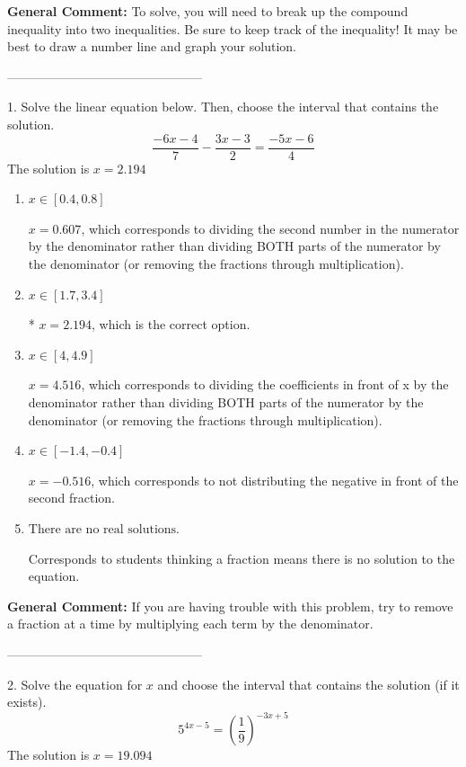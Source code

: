 \documentclass{extbook}[14pt]
\begin{document}
\textbf{General Comment:} To solve, you will need to break up the compound inequality into two inequalities. Be sure to keep track of the inequality! It may be best to draw a number line and graph your solution. 

-----------------------------------------------

1. Solve the linear equation below. Then, choose the interval that contains the solution.
\[ \frac{-6x -4}{7} - \frac{3x -3}{2} = \frac{-5x -6}{4} \] 
The solution is $ x = 2.194 $ 

\begin{enumerate}[label=\Alph*.] 
\item $ x \in [0.4, 0.8] $ 

  $x = 0.607$, which corresponds to dividing the second number in the numerator by the denominator rather than dividing BOTH parts of the numerator by the denominator (or removing the fractions through multiplication). 
\item $ x \in [1.7, 3.4] $ 

 * $x = 2.194$, which is the correct option. 
\item $ x \in [4, 4.9] $ 

  $x = 4.516$, which corresponds to dividing the coefficients in front of x by the denominator rather than dividing BOTH parts of the numerator by the denominator (or removing the fractions through multiplication). 
\item $ x \in [-1.4, -0.4] $ 

  $x = -0.516$, which corresponds to not distributing the negative in front of the second fraction. 
\item $ \text{There are no real solutions.} $ 

 Corresponds to students thinking a fraction means there is no solution to the equation. 
\end{enumerate} 
 
\textbf{General Comment:} If you are having trouble with this problem, try to remove a fraction at a time by multiplying each term by the denominator. 

-----------------------------------------------

2. Solve the equation for $x$ and choose the interval that contains the solution (if it exists).
\[ 5^{4x-5} = \left(\frac{1}{9}\right)^{-3x+5} \] 
The solution is $ x = 19.094 $ 
\end{document}
